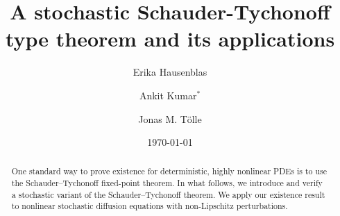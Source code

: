 \documentclass[english,a4paper,11pt]{amsart}
\theoremstyle{plain}
\theoremstyle{definition}
\theoremstyle{remark}
\numberwithin{equation}{section}
\begin{document}
	
	
	
	\title[Stochastic Schauder-Tychonoff type theorem]{A stochastic Schauder-Tychonoff type theorem and its applications}
	\author[E. Hausenblas]{Erika Hausenblas}
	\address{Montanuniversit\"{a}t Leoben\\
		Department Mathematik und Informationstechnologie\\
		Franz Josef Stra{\ss}e 18\\
		8700 Leoben\\
		Austria}
	

	
		\author[A. Kumar]{Ankit Kumar$^\ast$}
	\address{Montanuniversit\"{a}t Leoben\\
		Department Mathematik und Informationstechnologie\\
		Franz Josef Stra{\ss}e 18\\
		8700 Leoben\\
		Austria}
	
	
		\author[J. M. T\"olle]{Jonas M. T\"{o}lle}
	\address{Aalto University\\
		Department of Mathematics and Systems Analysis\\
		PO Box 11100 (Otakaari 1, Espoo)\\
		00076 Aalto\\
		Finland}
	\date{\today}
	\begin{abstract}
		One standard way to prove existence for deterministic, highly nonlinear PDEs is to use the Schauder–Tychonoff fixed-point theorem. In what follows, we introduce and verify a stochastic variant of the Schauder–Tychonoff theorem.  We apply our existence result to nonlinear stochastic diffusion equations with non-Lipschitz perturbations.
	\end{abstract}
	
\end{document}
